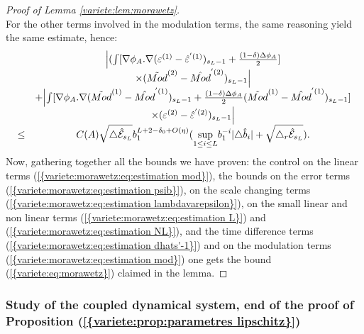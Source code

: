 \documentclass[11pt,a4paper,reqno]{amsart}
\theoremstyle{remark}
\numberwithin{equation}{section}
\begin{document}
\begin{proof}[Proof of Lemma \ref{variete:lem:morawetz}]
$$$$
For the other terms involved in the modulation terms, the same reasoning yield the same estimate, hence:
\begin{equation} \label{variete:morawetz:eq:estimation mod}
\begin{array}{r c l}
&\Bigl{|}(\int [\nabla \phi_A .\nabla(\varepsilon^{(1)}-\hat{\varepsilon}^{'(1)})_{s_L-1}+\frac{(1-\delta)\Delta \phi_A}{2}]\\
&\times(\tilde{Mod}^{(2)}-\hat{Mod}^{'(2)})_{s_L-1}\Bigr{|}\\
&+\Bigl{|}\int [\nabla \phi_A .\nabla(\tilde{Mod}^{(1)}-\hat{Mod}^{'(1)})_{s_L-1}+\frac{(1-\delta)\Delta \phi_A}{2}(\tilde{Mod}^{(1)}-\hat{Mod}^{'(1)})_{s_L-1}]\\
&\times (\varepsilon^{(2)}-\hat{\varepsilon}^{'(2)})_{s_L-1}\Bigr{|}\\
\leq & C(A) \sqrt{\triangle \hat{\mathcal{E}}_{s_L}}b_1^{L+2-\delta_0+O(\eta)}(\underset{1\leq i \leq L}{\text{sup}}b_1^{-i}|\triangle \hat{b}_i|+\sqrt{\triangle_r \hat{\mathcal{E}}_{s_L}}).
\end{array}
\end{equation}
Now, gathering together all the bounds we have proven: the control on the linear terms {{\rm (\ref{{variete:morawetz:eq:estimation mod}})}}, the bounds on the error terms {{\rm (\ref{{variete:morawetz:eq:estimation psib}})}}, on the scale changing terms {{\rm (\ref{{variete:morawetz:eq:estimation lambdavarepsilon}})}}, on the small linear and non linear terms {{\rm (\ref{{variete:morawetz:eq:estimation L}})}} and {{\rm (\ref{{variete:morawetz:eq:estimation NL}})}}, and the time difference terms {{\rm (\ref{{variete:morawetz:eq:estimation dhats'-1}})}} and on the modulation terms {{\rm (\ref{{variete:morawetz:eq:estimation mod}})}} one gets the bound {{\rm (\ref{{variete:eq:morawetz}})}} claimed in the lemma.
\end{proof}

\subsubsection{Study of the coupled dynamical system, end of the proof of Proposition {{\rm (\ref{{variete:prop:parametres lipschitz}})}}}
\end{document}
